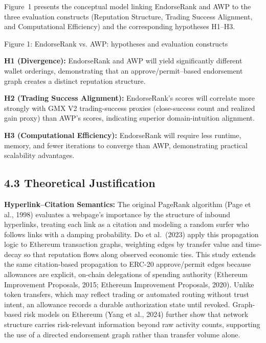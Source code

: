 Figure~1 presents the conceptual model linking EndorseRank and AWP to the three evaluation constructs (Reputation Structure, Trading Success Alignment, and Computational Efficiency) and the corresponding hypotheses H1--H3.


\begin{center}

\end{center}


\begin{center}Figure 1: EndorseRank vs. AWP: hypotheses and evaluation constructs\end{center}

\textbf{H1 (Divergence): }EndorseRank and AWP will yield significantly different wallet orderings, demonstrating that an approve/permit--based endorsement graph creates a distinct reputation structure.


\textbf{H2 (Trading Success Alignment): }EndorseRank's scores will correlate more strongly with GMX V2 trading-success proxies (close-success count and realized gain proxy) than AWP's scores, indicating superior domain-intuition alignment.


\textbf{H3 (Computational Efficiency): }EndorseRank will require less runtime, memory, and fewer iterations to converge than AWP, demonstrating practical scalability advantages.


\subsection*{4.3 Theoretical Justification}
\label{sec:theoretical-justification}

\textbf{Hyperlink--Citation Semantics: }The original PageRank algorithm (Page et al., 1998) evaluates a webpage's importance by the structure of inbound hyperlinks, treating each link as a citation and modeling a random surfer who follows links with a damping probability. Do et al.\ (2023) apply this propagation logic to Ethereum transaction graphs, weighting edges by transfer value and time-decay so that reputation flows along observed economic ties. This study extends the same citation-based propagation to ERC-20 approve/permit edges because allowances are explicit, on-chain delegations of spending authority (Ethereum Improvement Proposals, 2015; Ethereum Improvement Proposals, 2020). Unlike token transfers, which may reflect trading or automated routing without trust intent, an allowance records a durable authorization state until revoked. Graph-based risk models on Ethereum (Yang et al., 2024) further show that network structure carries risk-relevant information beyond raw activity counts, supporting the use of a directed endorsement graph rather than transfer volume alone.


